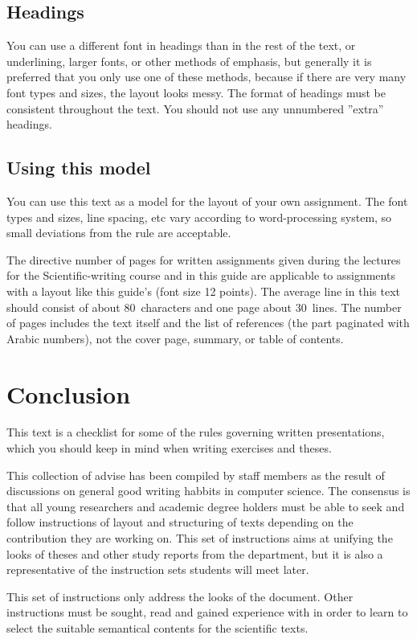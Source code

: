 \section{Headings}

You can use a different font in headings than in the rest of the text, or underlining, larger fonts, or other 
methods of emphasis, but generally it is preferred that you only use one of these methods, because if there are 
very many font types and sizes, the layout looks messy.  The format of headings must be consistent throughout 
the text. You should not use any unnumbered ''extra'' headings.


\section{Using this model}

You can use this text as a model for the layout of your own assignment. The font types and sizes, 
line spacing, etc vary according to word-processing system, so small deviations from the rule are acceptable.

The directive number of pages for written assignments given during the lectures for the Scientific-writing 
course and in this guide are applicable to assignments with a layout like this guide's (font size 12 points). The 
average line in this text should consist of about 80~characters and one page about 30~lines. The number of pages 
includes the text itself and the list of references (the part paginated with Arabic numbers), not the 
cover page, summary, or table of contents.

\chapter{Conclusion}

This text is a checklist for some of the rules governing written presentations, which you should 
keep in mind when writing exercises and theses.

This collection of advise has been compiled by staff members as the
result of discussions on general good writing habbits in computer
science. The consensus is that all young researchers and academic degree
holders must be able to seek and follow instructions of layout and
structuring of texts depending on the contribution they are working on. 
This set of instructions aims at unifying the looks of theses and other
study reports from the department, but it is also a representative of
the instruction sets students will meet later.

This set of instructions only address the looks of the document. Other
instructions must be sought, read and gained experience with in order to
learn to select the suitable semantical contents for the scientific texts.
